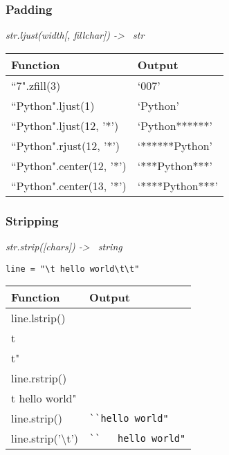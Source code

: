 \documentclass{beamer}
\begin{document}
%
%
\begin{frame}
  \frametitle{Padding}
  \textit{str.ljust(width[, fillchar]) -\textgreater~ str}
  \begin{table}
    \begin{tabular}{l | l}
    Function & Output \\
    \hline
    ``7".zfill(3) & `007' \\
    ``Python".ljust(1) & `Python' \\
    ``Python".ljust(12, '*') & `Python******' \\
    ``Python".rjust(12, '*') & `******Python' \\
    ``Python".center(12, '*') & `***Python***' \\
    ``Python".center(13, '*') & `****Python***'
    \end{tabular}
  \end{table}
\end{frame}


%
%
\begin{frame}
  \frametitle{Stripping}
  \textit{str.strip([chars]) -\textgreater~ string}

  \texttt{line = "\textbackslash t   hello world\textbackslash t\textbackslash t"}

  \begin{table}
    \begin{tabular}{l | l}
    Function & Output \\
    \hline
    line.lstrip()     & \lstinline{``hello world\\t\\t"} \\
    line.rstrip()     & \lstinline{``\\t   hello world"} \\
    line.strip()      & \lstinline{``hello world"}       \\
    line.strip('\textbackslash t') & \lstinline{``   hello world"}
    \end{tabular}
  \end{table}
\end{frame}
\end{document}
